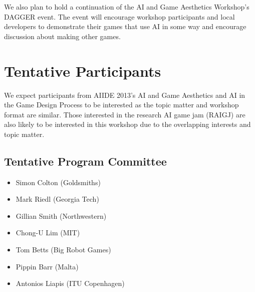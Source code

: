 \documentclass[10pt,a4paper]{article}
\begin{document}
We also plan to hold a continuation of the AI and Game Aesthetics Workshop's DAGGER event.
The event will encourage workshop participants and local developers to demonstrate their games that use AI in some way and encourage discussion about making other games.



\section{Tentative Participants}
We expect participants from AIIDE 2013's AI and Game Aesthetics and AI in the Game Design Process to be interested as the topic matter and workshop format are similar.
Those interested in the research AI game jam (RAIGJ) are also likely to be interested in this workshop due to the overlapping interests and topic matter.


\subsection*{Tentative Program Committee}
\begin{itemize}
\itemsep0em
\item Simon Colton (Goldsmiths)
\item Mark Riedl (Georgia Tech)
\item Gillian Smith (Northwestern)
\item Chong-U Lim (MIT)
\item Tom Betts (Big Robot Games)
\item Pippin Barr (Malta)
\item Antonios Liapis (ITU Copenhagen)
\end{itemize}
\end{document}
